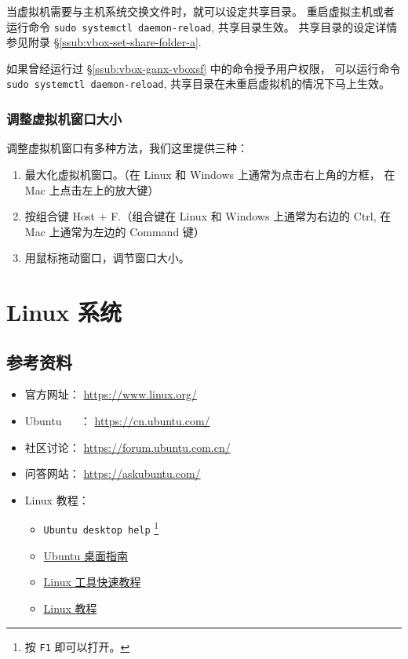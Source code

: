 \documentclass[
    11pt,
    cite=authoryear,
    device=normal,
    lang=cn,
    mode=simple,
    result=answer,
    toc=onecol,
]{elegantbook_sierxue}
\begin{document}
当虚拟机需要与主机系统交换文件时，就可以设定共享目录。
重启虚拟主机或者运行命令 \lstinline{sudo systemctl daemon-reload},
共享目录生效。
共享目录的设定详情参见附录 \S\ref{ssub:vbox-set-share-folder-a}.
\begin{tip}\label{tip:vbox-share-folder-activate}
    如果曾经运行过 \S\ref{ssub:vbox-ganx-vboxsf} 中的命令授予用户权限，
    可以运行命令 \lstinline{sudo systemctl daemon-reload},
    共享目录在未重启虚拟机的情况下马上生效。
\end{tip}

\subsubsection{调整虚拟机窗口大小}%
\label{ssub:vbox-set-window-size}

调整虚拟机窗口有多种方法，我们这里提供三种：
\begin{enumerate}
    \item 最大化虚拟机窗口。（在 Linux 和 Windows 上通常为点击右上角的方框，
        在 Mac 上点击左上的放大键）
    \item 按组合键 Host + F.（组合键在 Linux 和 Windows 上通常为右边的
        Ctrl, 在 Mac 上通常为左边的 Command 键）
    \item 用鼠标拖动窗口，调节窗口大小。
\end{enumerate}

\newpage
\section{Linux 系统}%
\label{sec:linux}

\subsection{参考资料}%
\label{sub:linux-refs}

\begin{itemize}
    \item 官方网址： \href{https://www.linux.org/}{https://www.linux.org/}
    \item Ubuntu ~ ~： \href{https://cn.ubuntu.com/}{https://cn.ubuntu.com/}
    \item 社区讨论：
        \href{https://forum.ubuntu.com.cn/}{https://forum.ubuntu.com.cn/}
    \item 问答网站：
        \href{https://askubuntu.com/}{https://askubuntu.com/}
    \item Linux 教程：
        \begin{itemize}
            \item \lstinline{Ubuntu desktop help}
                \footnote{按 \lstinline{F1} 即可以打开。}
            \item \href{https://help.ubuntu.com/lts/ubuntu-help/index.html}
                {Ubuntu 桌面指南}
            \item \href{https://linuxtools-rst.readthedocs.io/zh_CN/latest/}
                {Linux 工具快速教程}
            \item \href{https://dunwu.github.io/linux-tutorial/#/}
                {Linux 教程}
        \end{itemize}
\end{itemize}
\end{document}
